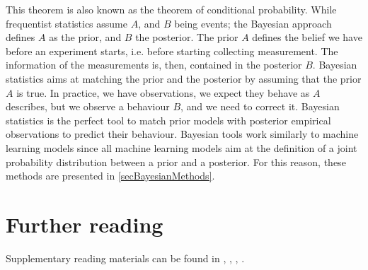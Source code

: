 This theorem is also known as the theorem of conditional probability. While frequentist statistics assume $A$, and $B$ being events; the Bayesian approach defines $A$ as the prior, and $B$ the posterior. The prior $A$ defines the belief we have before an experiment starts, i.e. before starting collecting measurement. The information of the measurements is, then, contained in the posterior $B$. Bayesian statistics aims at matching the prior and the posterior by assuming that the prior $A$ is true. In practice, we have observations, we expect they behave as $A$ describes, but we observe a behaviour $B$, and we need to correct it. Bayesian statistics is the perfect tool to match prior models with posterior empirical observations to predict their behaviour. Bayesian tools work similarly to machine learning models since all machine learning models aim at the definition of a joint probability distribution between a prior and a posterior. For this reason, these methods are presented in \ref{secBayesianMethods}.



\section*{Further reading}
Supplementary reading materials can be found in \cite{Sauter2002}, \cite{Ruppert2015}, \cite{Brandt2014}, \cite{Heibergerer2015}.





